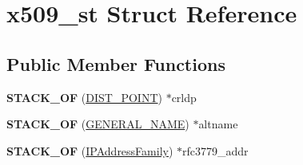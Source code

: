 \hypertarget{structx509__st}{}\section{x509\+\_\+st Struct Reference}
\label{structx509__st}
\subsection*{Public Member Functions}
\begin{DoxyCompactItemize}
\item 
\mbox{\label{structx509__st_afb336a1ff1a941897a28c7cf4690db37}} 
{\bfseries S\+T\+A\+C\+K\+\_\+\+OF} (\hyperlink{struct_d_i_s_t___p_o_i_n_t__st}{D\+I\+S\+T\+\_\+\+P\+O\+I\+NT}) $\ast$crldp
\item 
\mbox{\label{structx509__st_a3e784234d8bcf39deead74981e486435}} 
{\bfseries S\+T\+A\+C\+K\+\_\+\+OF} (\hyperlink{struct_g_e_n_e_r_a_l___n_a_m_e__st}{G\+E\+N\+E\+R\+A\+L\+\_\+\+N\+A\+ME}) $\ast$altname
\item 
\mbox{\label{structx509__st_aa297b23d7f80b42d209432a0613872be}} 
{\bfseries S\+T\+A\+C\+K\+\_\+\+OF} (\hyperlink{struct_i_p_address_family__st}{I\+P\+Address\+Family}) $\ast$rfc3779\+\_\+addr
\end{DoxyCompactItemize}
